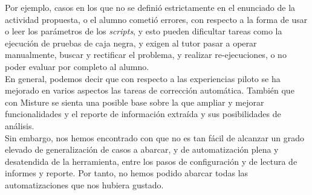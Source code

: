 Por ejemplo, casos en los que no se definió estrictamente en el enunciado de la actividad propuesta, o el alumno cometió errores, con respecto a la forma de usar o leer los parámetros de los \textit{scripts}, y esto pueden dificultar tareas como la ejecución de pruebas de caja negra, y exigen al tutor pasar a operar manualmente, buscar y rectificar el problema, y realizar re-ejecuciones, o no poder evaluar por completo al alumno.\\


En general, podemos decir que con respecto a las experiencias piloto se ha mejorado en varios aspectos las tareas de corrección automática. También que con Misture se sienta una posible base sobre la que ampliar y mejorar funcionalidades y el reporte de información extraída y sus posibilidades de análisis.\\

Sin embargo, nos hemos encontrado con que no es tan fácil de alcanzar un grado elevado de generalización de casos a abarcar, y de automatización plena y desatendida de la herramienta, entre los pasos de configuración y de lectura de informes y reporte. Por tanto, no hemos podido abarcar todas las automatizaciones que nos hubiera gustado.\\


